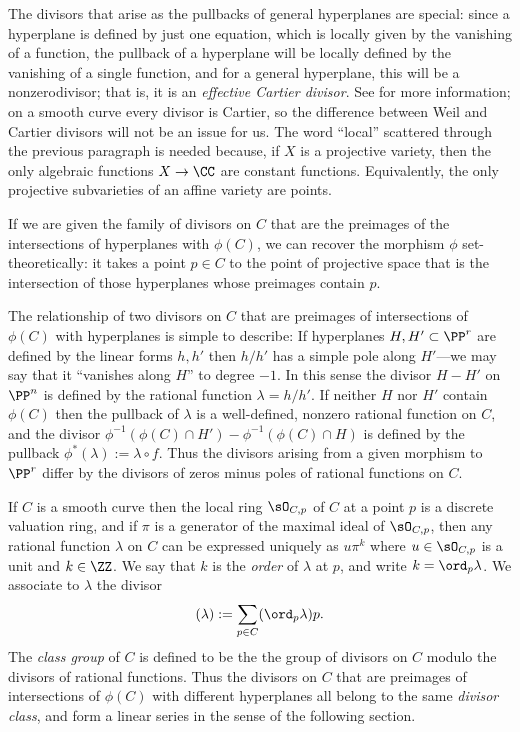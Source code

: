 The divisors that arise as the pullbacks of general hyperplanes are special: since a hyperplane is defined by just one equation, which is locally given by the vanishing of a function, the pullback of a hyperplane will be locally defined by the vanishing of a single function,
and for a general hyperplane, this will be a nonzerodivisor; that is, it is an  \emph{effective Cartier divisor}. See \cite[pp. 140-146]{H} for more information; on a smooth curve every divisor is Cartier, so the difference between Weil and Cartier divisors will not be an issue for us.
The  word ``local'' scattered through the previous paragraph is needed because, if $X$ is a projective variety, then the only algebraic functions $X\to \CC$ are constant functions. Equivalently, the only projective subvarieties of an affine variety are points.

If we are given the family of divisors on $C$ that are the preimages of the intersections of hyperplanes with  $\phi(C)$, we can recover the morphism $\phi$ set-theoretically: it takes a point $p\in C$ to the point of projective space that is the intersection of those
hyperplanes whose preimages contain $p$. 

The relationship of two divisors on $C$ that are preimages of intersections of $\phi(C)$ with hyperplanes is simple to describe: If hyperplanes
$H, H'\subset \PP^r$ are defined by the linear forms $h, h'$  then $h/h'$ has a simple pole along $H'$---we may say that it ``vanishes along $H$'' to degree $-1$.
In this sense the divisor $H-H'$ on $\PP^n$ is defined by the rational function $\lambda= h/h'$. If neither $H$ nor $H'$ contain $\phi(C)$ then the pullback of $\lambda$ is a well-defined, nonzero rational function on $C$, and the divisor 
$\phi^{-1}(\phi(C)\cap H') - \phi^{-1}(\phi(C)\cap H)$ is defined by the pullback  $\phi^*(\lambda) := \lambda \circ f$. Thus the divisors arising from a given morphism to $\PP^{r}$ differ by the divisors of zeros minus poles of rational functions on $C$. 

If $C$ is a smooth curve then the local ring $\sO_{C,p}$ of $C$ at a point $p$ is a discrete valuation ring, and if $\pi$ is a generator of the maximal ideal of $\sO_{C,p}$, then any rational
function $\lambda$ on $C$ can be expressed uniquely as $u\pi^k$ where $u\in \sO_{C,p}$ is a unit and $k\in \ZZ$. We say that $k$ is
the \emph{order} of $\lambda$ at $p$, and write $k = \ord_p \lambda$. We associate to $\lambda$  the divisor
$$
(\lambda) := \sum_{p\in C} (\ord_p\lambda)p.
$$
The \emph{class group} of $C$ is defined to be the the group of divisors on $C$ modulo the divisors of rational functions.
Thus the divisors on $C$ that are preimages of intersections of $\phi(C)$ with different hyperplanes all belong to the same
\emph{divisor class}, and form a linear series in the sense of the following section.

